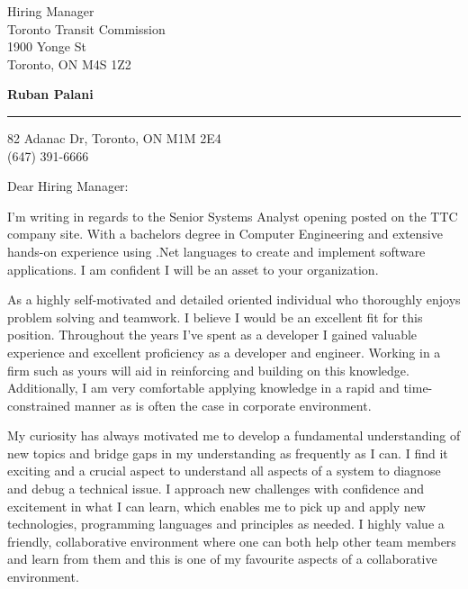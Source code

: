 \documentclass{letter} %
\begin{document}
\signature{Ruban Palani}           %
\longindentation=0pt                       %
\let\raggedleft\raggedright                %
 
 
\begin{letter}{
Hiring Manager \\
Toronto Transit Commission \\
1900 Yonge St \\
Toronto, ON M4S 1Z2}


\begin{flushleft}
{\large\bf Ruban Palani}
\end{flushleft}
\medskip\hrule height 1pt
\begin{flushright}
\hfill 82 Adanac Dr, Toronto, ON M1M 2E4 \\
\hfill (647) 391-6666 
\end{flushright} 
\vfill %

 
\opening{Dear Hiring Manager:} 
 
\noindent I'm writing in regards to the Senior Systems Analyst opening posted on the TTC 
company site. With a bachelors degree in Computer Engineering and extensive hands-on 
experience using .Net languages to create and implement software applications. I am confident I will be an asset to your organization.
 
\noindent As a highly self-motivated and detailed oriented individual who thoroughly enjoys problem solving and teamwork. I believe I would be an excellent fit for this position. Throughout the years I've spent as a developer I gained valuable experience and excellent proficiency as a developer and engineer. Working in a firm such as yours will aid in reinforcing and building on this knowledge. Additionally, I am very comfortable 
applying knowledge in a rapid and time-constrained manner as is often the case in 
corporate environment.

\noindent My curiosity has always motivated me to develop a fundamental understanding of new topics and bridge gaps in my understanding as frequently as I can. I find it exciting and a crucial aspect to understand all aspects of a system to diagnose and debug a technical issue. I approach new challenges with confidence and excitement in what I can learn, which enables me to pick up and apply new technologies, programming languages and principles as needed. I highly value a friendly, collaborative environment where one can both help other team members and learn from them and this is one of my 
favourite aspects of a collaborative environment.
 

\end{letter}
\end{document}
